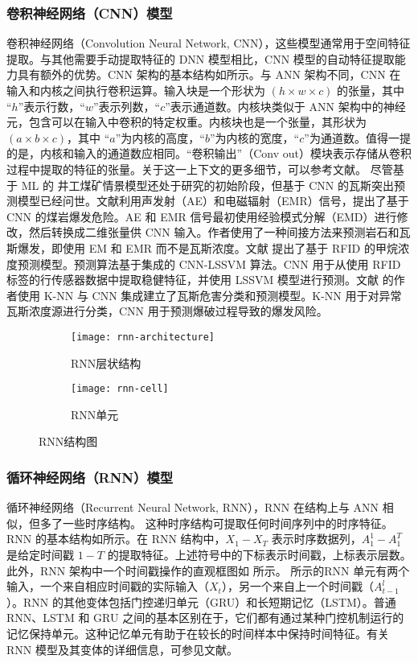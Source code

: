 \documentclass[lang=cn,a4paper,citestyle=gb7714-2015, bibstyle=gb7714-2015]{elegantpaper}
\newcommand{\mycite}[1]{\textsuperscript{\parencite{#1}}}
\begin{document}
    \subsubsection{卷积神经网络（CNN）模型}
    卷积神经网络（Convolution Neural Network, CNN），这些模型通常用于空间特征提取。与其他需要手动提取特征的 DNN 模型相比，CNN 模型的自动特征提取能力具有额外的优势\mycite{Alzubaidi2021}。CNN 架构的基本结构如所示。与 ANN 架构不同，CNN 在输入和内核之间执行卷积运算。输入块是一个形状为 $(h \times w \times c)$ 的张量，其中 “$h$”表示行数，“$w$”表示列数，“$c$”表示通道数。内核块类似于 ANN 架构中的神经元，包含可以在输入中卷积的特定权重。内核块也是一个张量，其形状为$(a \times b \times c)$，其中 “$a$”为内核的高度，“$b$”为内核的宽度，“$c$”为通道数。值得一提的是，内核和输入的通道数应相同。“卷积输出”（Conv out）模块表示存储从卷积过程中提取的特征的张量。关于这一上下文的更多细节，可以参考文献\mycite{ref29}。
    \bigskip
    尽管基于 ML 的 井工煤矿情景模型还处于研究的初始阶段，但基于 CNN 的瓦斯突出预测模型已经问世。文献\mycite{Li2021}利用声发射（AE）和电磁辐射（EMR）信号，提出了基于 CNN 的煤岩爆发危险。AE 和 EMR 信号最初使用经验模式分解（EMD）进行修改，然后转换成二维张量供 CNN 输入。作者使用了一种间接方法来预测岩石和瓦斯爆发，即使用 EM 和 EMR 而不是瓦斯浓度。文献\mycite{Zhang2018} 提出了基于 RFID 的甲烷浓度预测模型。预测算法基于集成的 CNN-LSSVM 算法。CNN 用于从使用 RFID 标签的行传感器数据中提取稳健特征，并使用 LSSVM 模型进行预测。文献\mycite{Qiu2022} 的作者使用 K-NN 与 CNN 集成建立了瓦斯危害分类和预测模型。K-NN 用于对异常瓦斯浓度源进行分类，CNN 用于预测爆破过程导致的爆发风险。
    \begin{figure}[!h]
        \centering
        \begin{subfigure}[b]{0.5\textwidth}
            \texttt{[image: rnn-architecture]}
            \caption{RNN层状结构}
            \label{fig:rnn-architecture}
        \end{subfigure}
        \begin{subfigure}[b]{0.4\textwidth}
            \texttt{[image: rnn-cell]}
            \caption{RNN单元}
            \label{fig:rnn-cell}
        \end{subfigure}
        \caption{RNN结构图}
    \end{figure}

    \subsubsection{循环神经网络（RNN）模型}
    循环神经网络（Recurrent Neural Network, RNN），RNN 在结构上与 ANN 相似，但多了一些时序结构。
    这种时序结构可提取任何时间序列中的时序特征。RNN 的基本结构如所示。在 RNN 结构中，$X_1-X_T$ 表示时序数据列，$A_1^1-A_1^T$是给定时间戳 $1-T$ 的提取特征。上述符号中的下标表示时间戳，上标表示层数。此外，RNN 架构中一个时间戳操作的直观框图如 所示。 所示的RNN 单元有两个输入，一个来自相应时间戳的实际输入（$X_t$），另一个来自上一个时间戳（$A^l_{t-1}$）。RNN 的其他变体包括门控递归单元（GRU）和长短期记忆（LSTM）。普通 RNN、LSTM 和 GRU 之间的基本区别在于，它们都有通过某种门控机制运行的记忆保持单元。这种记忆单元有助于在较长的时间样本中保持时间特征。有关 RNN 模型及其变体的详细信息，可参见文献\mycite{ref79}。
\end{document}
